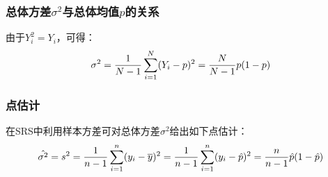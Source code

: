 \subsubsection{总体方差$\sigma^2$与总体均值$p$的关系}
由于$Y_i^2=Y_i$，可得：
\begin{equation}
	\sigma^2=\frac{1}{N-1}\sum_{i=1}^N(Y_i-p)^2=\frac{N}{N-1}p(1-p)\notag
\end{equation}
\subsubsection{点估计}
\begin{definition}
	在SRS中利用样本方差可对总体方差$\sigma^2$给出如下点估计：
	\begin{equation}
		\hat{\sigma^2}=s^2=\frac{1}{n-1}\sum_{i=1}^n(y_i-\overline{y})^2=\frac{1}{n-1}\sum_{i=1}^n(y_i-\hat{p})^2=\frac{n}{n-1}\hat{p}(1-\hat{p})\notag
	\end{equation}
\end{definition}

